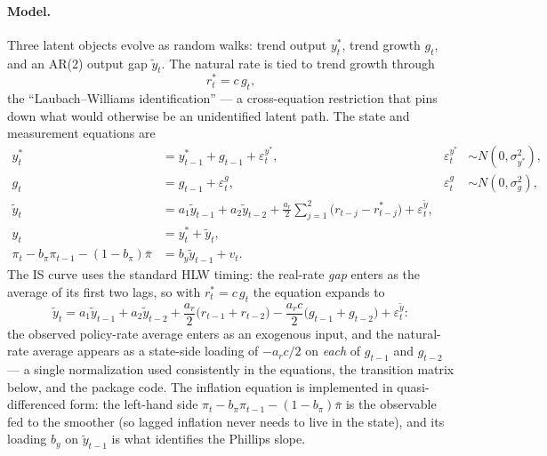 \documentclass[11pt]{article}
\begin{document}
\paragraph{Model.}  Three latent objects evolve as random walks: trend
output $y^*_t$, trend growth $g_t$, and an AR(2) output gap
$\widetilde y_t$.  The natural rate is tied to trend growth through
\begin{equation}
r^*_t = c\,g_t,
\end{equation}
the ``Laubach--Williams identification'' --- a cross-equation
restriction that pins down what would otherwise be an
unidentified latent path.  The state and measurement equations are
\begin{align}
y^*_t &= y^*_{t-1}+g_{t-1}+\varepsilon^{y^*}_t,
   &\varepsilon^{y^*}_t&\sim N(0,\sigma_{y^*}^2),\\
g_t &= g_{t-1}+\varepsilon^g_t,
   &\varepsilon^g_t&\sim N(0,\sigma_g^2),\\
\widetilde y_t &= a_1\widetilde y_{t-1}+a_2\widetilde y_{t-2}
                 +\frac{a_r}{2}\sum_{j=1}^{2}\bigl(r_{t-j}-r^*_{t-j}\bigr)
                 +\varepsilon^{\widetilde y}_t,\\
y_t&=y^*_t+\widetilde y_t,\\
\pi_t - b_\pi\pi_{t-1}-(1-b_\pi)\bar\pi &= b_y\widetilde y_{t-1}+v_t.
\end{align}
The IS curve uses the standard HLW timing: the real-rate \emph{gap}
enters as the average of its first two lags, so with
$r^*_t=c\,g_t$ the equation expands to
\begin{equation}
\widetilde y_t = a_1\widetilde y_{t-1}+a_2\widetilde y_{t-2}
   +\frac{a_r}{2}\bigl(r_{t-1}+r_{t-2}\bigr)
   -\frac{a_r c}{2}\bigl(g_{t-1}+g_{t-2}\bigr)
   +\varepsilon^{\widetilde y}_t :
\end{equation}
the observed policy-rate average enters as an exogenous input, and the
natural-rate average appears as a state-side loading of $-a_r c/2$ on
\emph{each} of $g_{t-1}$ and $g_{t-2}$ --- a single normalization used
consistently in the equations, the transition matrix below, and the
package code.  The inflation equation is implemented in
quasi-differenced form: the left-hand side
$\pi_t-b_\pi\pi_{t-1}-(1-b_\pi)\bar\pi$ is the observable fed to the
smoother (so lagged inflation never needs to live in the state), and
its loading $b_y$ on $\widetilde y_{t-1}$ is what identifies the
Phillips slope.
\end{document}
